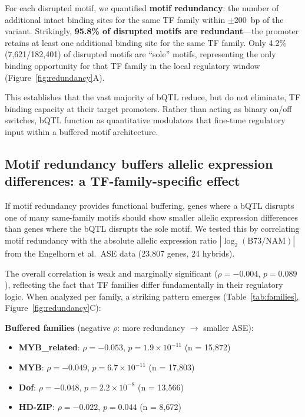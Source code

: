 \documentclass[11pt,a4paper]{article}
\begin{document}
For each disrupted motif, we quantified \textbf{motif redundancy}: the number of additional intact binding sites for the same TF family within $\pm$200~bp of the variant. Strikingly, \textbf{95.8\% of disrupted motifs are redundant}---the promoter retains at least one additional binding site for the same TF family. Only 4.2\% (7,621/182,401) of disrupted motifs are ``sole'' motifs, representing the only binding opportunity for that TF family in the local regulatory window (Figure~\ref{fig:redundancy}A).

This establishes that the vast majority of bQTL reduce, but do not eliminate, TF binding capacity at their target promoters. Rather than acting as binary on/off switches, bQTL function as quantitative modulators that fine-tune regulatory input within a buffered motif architecture.

\subsection{Motif redundancy buffers allelic expression differences: a TF-family-specific effect}

If motif redundancy provides functional buffering, genes where a bQTL disrupts one of many same-family motifs should show smaller allelic expression differences than genes where the bQTL disrupts the sole motif. We tested this by correlating motif redundancy with the absolute allelic expression ratio $|\log_2(\text{B73/NAM})|$ from the Engelhorn et al.\ ASE data (23,807 genes, 24 hybrids).

The overall correlation is weak and marginally significant ($\rho = -0.004$, $p = 0.089$), reflecting the fact that TF families differ fundamentally in their regulatory logic. When analyzed per family, a striking pattern emerges (Table~\ref{tab:families}, Figure~\ref{fig:redundancy}C):

\textbf{Buffered families} (negative $\rho$: more redundancy $\rightarrow$ smaller ASE):
\begin{itemize}
    \item \textbf{MYB\_related}: $\rho = -0.053$, $p = 1.9 \times 10^{-11}$ (n = 15,872)
    \item \textbf{MYB}: $\rho = -0.049$, $p = 6.7 \times 10^{-11}$ (n = 17,803)
    \item \textbf{Dof}: $\rho = -0.048$, $p = 2.2 \times 10^{-8}$ (n = 13,566)
    \item \textbf{HD-ZIP}: $\rho = -0.022$, $p = 0.044$ (n = 8,672)
\end{itemize}
\end{document}
